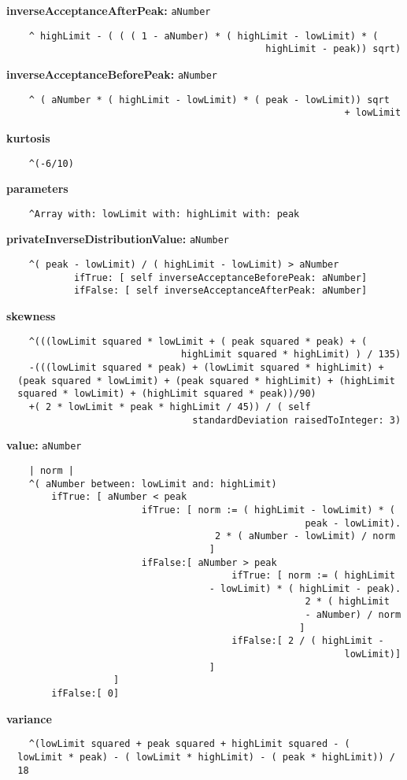 {\bf inverseAcceptanceAfterPeak:} {\tt aNumber}
\begin{verbatim}
    ^ highLimit - ( ( ( 1 - aNumber) * ( highLimit - lowLimit) * ( 
                                              highLimit - peak)) sqrt)

\end{verbatim}
{\bf inverseAcceptanceBeforePeak:} {\tt aNumber}
\begin{verbatim}
    ^ ( aNumber * ( highLimit - lowLimit) * ( peak - lowLimit)) sqrt 
                                                            + lowLimit

\end{verbatim}
{\bf kurtosis}
\begin{verbatim}
    ^(-6/10)

\end{verbatim}
{\bf parameters}
\begin{verbatim}
    ^Array with: lowLimit with: highLimit with: peak

\end{verbatim}
{\bf privateInverseDistributionValue:} {\tt aNumber}
\begin{verbatim}
    ^( peak - lowLimit) / ( highLimit - lowLimit) > aNumber
            ifTrue: [ self inverseAcceptanceBeforePeak: aNumber]
            ifFalse: [ self inverseAcceptanceAfterPeak: aNumber]

\end{verbatim}
{\bf skewness}
\begin{verbatim}
    ^(((lowLimit squared * lowLimit + ( peak squared * peak) + ( 
                               highLimit squared * highLimit) ) / 135)
    -(((lowLimit squared * peak) + (lowLimit squared * highLimit) + 
  (peak squared * lowLimit) + (peak squared * highLimit) + (highLimit 
  squared * lowLimit) + (highLimit squared * peak))/90)
    +( 2 * lowLimit * peak * highLimit / 45)) / ( self 
                                 standardDeviation raisedToInteger: 3)

\end{verbatim}
{\bf value:} {\tt aNumber}
\begin{verbatim}
    | norm |
    ^( aNumber between: lowLimit and: highLimit)
        ifTrue: [ aNumber < peak
                        ifTrue: [ norm := ( highLimit - lowLimit) * ( 
                                                     peak - lowLimit).
                                     2 * ( aNumber - lowLimit) / norm
                                    ]
                        ifFalse:[ aNumber > peak
                                        ifTrue: [ norm := ( highLimit 
                                    - lowLimit) * ( highLimit - peak).
                                                     2 * ( highLimit 
                                                     - aNumber) / norm
                                                    ]
                                        ifFalse:[ 2 / ( highLimit - 
                                                            lowLimit)]
                                    ]
                   ]
        ifFalse:[ 0]

\end{verbatim}
{\bf variance}
\begin{verbatim}
    ^(lowLimit squared + peak squared + highLimit squared - ( 
  lowLimit * peak) - ( lowLimit * highLimit) - ( peak * highLimit)) / 
  18

\end{verbatim}

